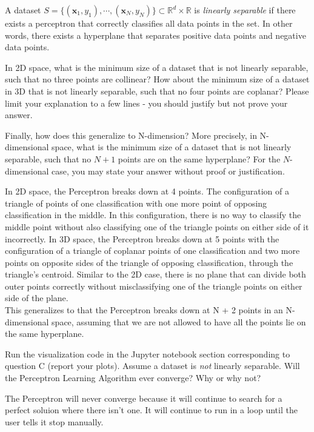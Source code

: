 \begin{problem}[4]
  A dataset $S = \{(\mathbf{x}_1, y_1),\cdots,(\mathbf{x}_N, y_N)\} \subset \mathbb{R}^d \times \mathbb{R}$ is \emph{linearly separable} if there exists a perceptron that correctly classifies all data points in the set. In other words, there exists a hyperplane that separates positive data points and negative data points.

  In 2D space, what is the minimum size of a dataset that is not linearly separable, such that no three points are collinear? How about the minimum size of a dataset in 3D that is not linearly separable, such that no four points are coplanar? Please limit your explanation to a few lines - you should justify but not prove your answer.

  Finally, how does this generalize to N-dimension? More precisely, in N-dimensional space, what is the minimum size of a dataset that is not linearly separable, such that no $N+1$ points are on the same hyperplane? For the $N$-dimensional case, you may state your answer without proof or justification.
\end{problem}
\begin{solution}
  In 2D space, the Perceptron breaks down at 4 points. The configuration of a triangle of points of one classification with one more point of opposing classification in the middle. In this configuration, there is no way to classify the middle point without also classifying one of the triangle points on either side of it incorrectly. In 3D space, the Perceptron breaks down at 5 points with the configuration of a triangle of coplanar points of one classification and two more points on opposite sides of the triangle of opposing classification, through the triangle's centroid. Similar to the 2D case, there is no plane that can divide both outer points correctly without misclassifying one of the triangle points on either side of the plane.  \\
  This generalizes to that the Perceptron breaks down at N + 2 points in an N-dimensional space, assuming that we are not allowed to have all the points lie  on the same hyperplane.
\end{solution}

\begin{problem}[2]
  Run the visualization code in the Jupyter notebook section corresponding to question C (report your plots). Assume a dataset is \emph{not} linearly separable. Will the Perceptron Learning Algorithm ever converge? Why or why not?
\end{problem}
\begin{solution}
  The Perceptron will never converge because it will continue to search for a perfect soluion where there isn't one. It will continue to run in a loop until the user tells it stop manually.
\end{solution}

